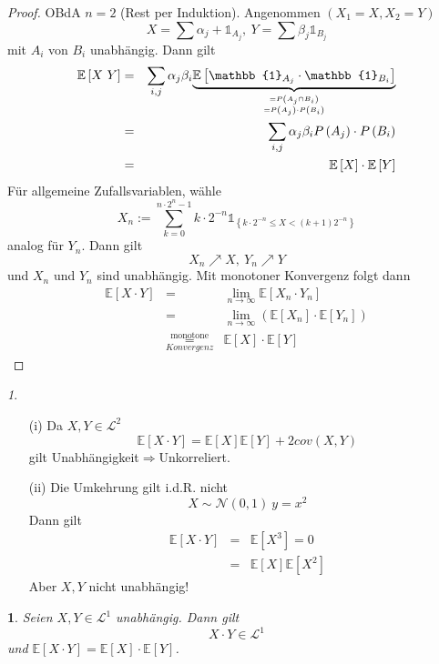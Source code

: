 \documentclass[10pt,a4paper]{report}
\numberwithin{equation}{section}
\numberwithin{figure}{section}
\theoremstyle{plain}
\theoremstyle{definition}
\theoremstyle{remark}
\newtheorem{rem}[thm]{\protect\remarkname}
\theoremstyle{plain}
\newtheorem{cor}[thm]{\protect\corollaryname}
\providecommand{\corollaryname}{Korollar}
\providecommand{\remarkname}{Bemerkung}
\newcommand{\1}{ \mathbb{1} } %
\begin{document}
\begin{proof}
  OBdA $n=2$ (Rest per Induktion). Angenommen $\left(X_{1}=X,X_{2}=Y\right)$
  \[
  X=\sum\alpha_{j}+\1_{A_{j}},\ Y=\sum\beta_{j}\1_{B_{j}}
  \]
  mit $A_{i}$ von $B_{i}$ unabhängig. Dann gilt
  \begin{eqnarray*}
    \mathbb{E}\left[X\ Y\right] & = & \sum_{i,j}\alpha_{j}\beta_{i}\underset{{=P\left(A_{j}\cap B_{i}\right)\atop =P\left(A_{j}\right)\cdot P\left(B_{i}\right)}}{\underbrace{\mathbb{E}\left[\1_{A_{j}}\cdot\1_{B_{i}}\right]}}\\
    & = & \sum_{i,j}\alpha_{j}\beta_{i}P\left(A_{j}\right)\cdot P\left(B_{i}\right)\\
    & = & \mathbb{E}\left[X\right]\cdot\mathbb{E}\left[Y\right]
  \end{eqnarray*}
  Für allgemeine Zufallsvariablen, wähle 
  \[
  X_{n}:=\sum_{k=0}^{n\cdot2^{n}-1}k\cdot2^{-n}\1_{\left\{ k\cdot2^{-n}\leq X<\left(k+1\right)2^{-n}\right\} }
  \]
  analog für $Y_{n}$. Dann gilt
  \[
  X_{n}\nearrow X,\ Y_{n}\nearrow Y
  \]
  und $X_{n}$ und $Y_{n}$ sind unabhängig. Mit monotoner Konvergenz
  folgt dann
  \begin{eqnarray*}
    \mathbb{E}\left[X\cdot Y\right] & = & \lim_{n\to\infty}\mathbb{E}\left[X_{n}\cdot Y_{n}\right]\\
    & = & \lim_{n\to\infty}\left(\mathbb{E}\left[X_{n}\right]\cdot\mathbb{E}\left[Y_{n}\right]\right)\\
    & \overset{\text{monotone}}{\underset{Konvergenz}{=}} & \mathbb{E}\left[X\right]\cdot\mathbb{E}\left[Y\right]
  \end{eqnarray*}
\end{proof}
\begin{rem} \ 
  \begin{itemize}
  \item[(i)] Da $X,Y\in\mathcal{L}^{2}$
    \[
    \mathbb{E}\left[X\cdot
      Y\right]=\mathbb{E}\left[X\right]\mathbb{E}\left[Y\right]+2cov\left(X,Y\right)
    \]
    gilt Unabhängigkeit$\Rightarrow$Unkorreliert.
  \item[(ii)] Die Umkehrung gilt i.d.R. nicht
    \[
    X\sim\mathcal{N}\left(0,1\right)\ y=x^{2}
    \]
    Dann gilt
    \begin{eqnarray*}
      \mathbb{E}\left[X\cdot Y\right] & = & \mathbb{E}\left[X^{3}\right]=0\\
      & = & \mathbb{E}\left[X\right]\mathbb{E}\left[X^{2}\right]
    \end{eqnarray*}
    Aber $X,Y$ nicht unabhängig!
  \end{itemize}
\end{rem}
\begin{cor} %
  Seien $X,Y\in\mathcal{L}^{1}$ unabhängig. Dann gilt
  \[
  X\cdot Y\in\mathcal{L}^{1}
  \]
  und $\mathbb{E}\left[X\cdot Y\right]=\mathbb{E}\left[X\right]\cdot\mathbb{E}\left[Y\right]$.
\end{cor}
\end{document}
